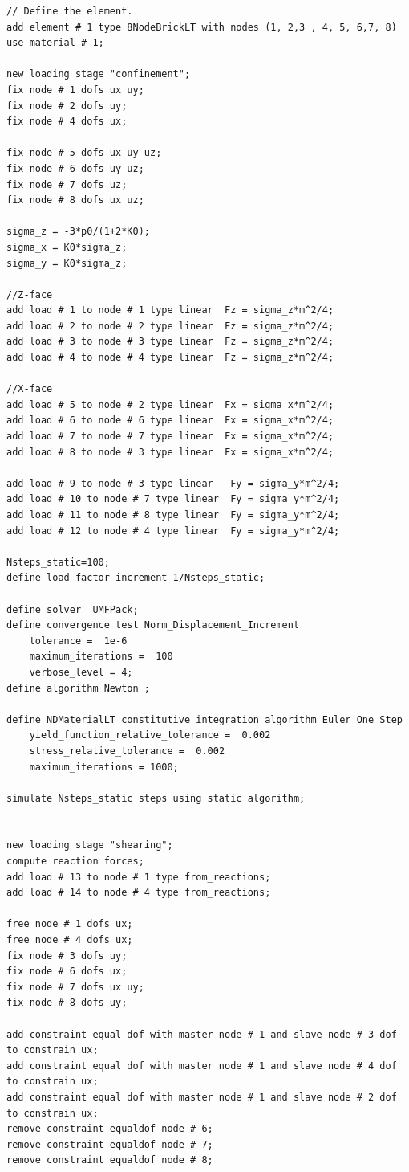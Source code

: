 \documentclass[fleqn,11pt]{article}
\begin{document}
\begin{lstlisting}
// Define the element.
add element # 1 type 8NodeBrickLT with nodes (1, 2,3 , 4, 5, 6,7, 8) use material # 1;

new loading stage "confinement";
fix node # 1 dofs ux uy;
fix node # 2 dofs uy;
fix node # 4 dofs ux;

fix node # 5 dofs ux uy uz;
fix node # 6 dofs uy uz;
fix node # 7 dofs uz;
fix node # 8 dofs ux uz;

sigma_z = -3*p0/(1+2*K0);
sigma_x = K0*sigma_z;
sigma_y = K0*sigma_z;

//Z-face
add load # 1 to node # 1 type linear  Fz = sigma_z*m^2/4;
add load # 2 to node # 2 type linear  Fz = sigma_z*m^2/4;
add load # 3 to node # 3 type linear  Fz = sigma_z*m^2/4;
add load # 4 to node # 4 type linear  Fz = sigma_z*m^2/4;

//X-face
add load # 5 to node # 2 type linear  Fx = sigma_x*m^2/4;
add load # 6 to node # 6 type linear  Fx = sigma_x*m^2/4;
add load # 7 to node # 7 type linear  Fx = sigma_x*m^2/4;
add load # 8 to node # 3 type linear  Fx = sigma_x*m^2/4;

add load # 9 to node # 3 type linear   Fy = sigma_y*m^2/4;
add load # 10 to node # 7 type linear  Fy = sigma_y*m^2/4;
add load # 11 to node # 8 type linear  Fy = sigma_y*m^2/4;
add load # 12 to node # 4 type linear  Fy = sigma_y*m^2/4;

Nsteps_static=100;
define load factor increment 1/Nsteps_static;

define solver  UMFPack;
define convergence test Norm_Displacement_Increment  
    tolerance =  1e-6
    maximum_iterations =  100
    verbose_level = 4;
define algorithm Newton ;

define NDMaterialLT constitutive integration algorithm Euler_One_Step
    yield_function_relative_tolerance =  0.002
    stress_relative_tolerance =  0.002
    maximum_iterations = 1000;

simulate Nsteps_static steps using static algorithm;


new loading stage "shearing";
compute reaction forces;
add load # 13 to node # 1 type from_reactions;
add load # 14 to node # 4 type from_reactions;

free node # 1 dofs ux;
free node # 4 dofs ux;
fix node # 3 dofs uy;
fix node # 6 dofs ux;
fix node # 7 dofs ux uy;
fix node # 8 dofs uy;

add constraint equal dof with master node # 1 and slave node # 3 dof to constrain ux;
add constraint equal dof with master node # 1 and slave node # 4 dof to constrain ux;
add constraint equal dof with master node # 1 and slave node # 2 dof to constrain ux;
remove constraint equaldof node # 6;
remove constraint equaldof node # 7;
remove constraint equaldof node # 8;


\end{lstlisting}
\end{document}
